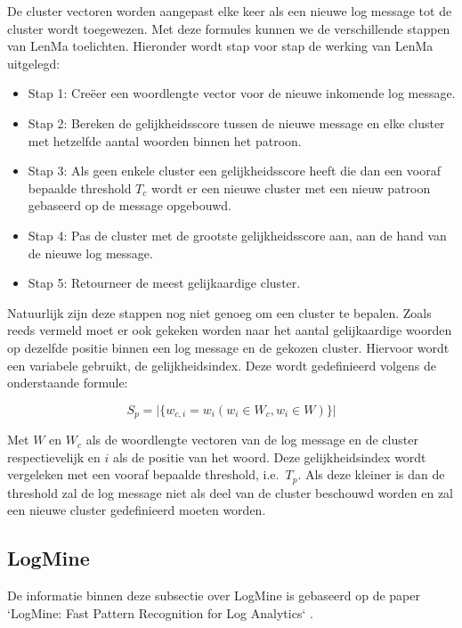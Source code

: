De cluster vectoren worden aangepast elke keer als een nieuwe log message tot de cluster wordt toegewezen. Met deze formules kunnen we de verschillende stappen van LenMa toelichten. Hieronder wordt stap voor stap de werking van LenMa uitgelegd:
\begin{itemize}
    \item Stap 1: Creëer een woordlengte vector voor de nieuwe inkomende log message.
    \item Stap 2: Bereken de gelijkheidsscore tussen de nieuwe message en elke cluster met hetzelfde aantal woorden binnen het patroon.
    \item Stap 3: Als geen enkele cluster een gelijkheidsscore heeft die dan een vooraf bepaalde threshold \(T_{c}\) wordt er een nieuwe cluster met een nieuw patroon gebaseerd op de message opgebouwd.
    \item Stap 4: Pas de cluster met de grootste gelijkheidsscore aan, aan de hand van de nieuwe log message. 
    \item Stap 5: Retourneer de meest gelijkaardige cluster.
\end{itemize}

Natuurlijk zijn deze stappen nog niet genoeg om een cluster te bepalen. Zoals reeds vermeld moet er ook gekeken worden naar het aantal gelijkaardige woorden op dezelfde positie binnen een log message en de gekozen cluster. Hiervoor wordt een variabele gebruikt, de gelijkheidsindex. Deze wordt gedefinieerd volgens de onderstaande formule: 

\[S_{p} = \lvert \{w_{c,i} = w_{i}(w_{i} \in W_{c}, w_{i} \in W)\} \rvert\]

Met \(W\) en \(W_{c}\) als de woordlengte vectoren van de log message en de cluster respectievelijk en $i$ als de positie van het woord. Deze gelijkheidsindex wordt vergeleken met een vooraf bepaalde threshold, i.e.\ \(T_{p}\). Als deze kleiner is dan de threshold zal de log message niet als deel van de cluster beschouwd worden en zal een nieuwe cluster gedefinieerd moeten worden.

\subsection{LogMine}
De informatie binnen deze subsectie over LogMine is gebaseerd op de paper `LogMine: Fast Pattern Recognition for Log Analytics` \autocite{hamooni2016logmine}.

